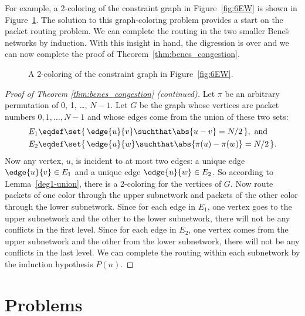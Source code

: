 For example, a 2-coloring of the constraint graph in
Figure~\ref{fig:6EW} is shown in Figure~\ref{fig:6EX}.  The solution
to this graph-coloring problem provides a start on the packet routing
problem.  We can complete the routing in the two smaller Bene\u{s}
networks by induction.  With this insight in hand, the digression is
over and we can now complete the proof of
Theorem~\ref{thm:benes_congestion}.

\begin{figure}


\caption{A 2-coloring of the constraint graph in
  Figure~\ref{fig:6EW}.}

\label{fig:6EX}

\end{figure}

\begin{proof}[Proof of Theorem \ref{thm:benes_congestion}
    \textup(continued\textup)]

Let $\pi$ be an arbitrary permutation of 0, 1, \dots, $N-1$.  Let $G$
be the graph whose vertices are packet numbers $0, 1, \dots, N-1$ and
whose edges come from the union of these two sets:
\begin{align*}
E_1 \eqdef &  \set{\, \edge{u}{v} \suchthat \abs{u - v} = N/2 \,},\ \text{and} \\
E_2 \eqdef &  \set{\, \edge{u}{w} \suchthat \abs{\pi(u) - \pi(w)} = N/2\,}.
\end{align*}
Now any vertex, $u$, is incident to at most two edges: a unique edge
$\edge{u}{v} \in E_1$ and a unique edge $\edge{u}{w} \in E_2$.  So
according to Lemma~\ref{deg1-union}, there is a 2-coloring for the
vertices of $G$.  Now route packets of one color through the upper
subnetwork and packets of the other color through the lower
subnetwork.  Since for each edge in $E_1$, one vertex goes to the
upper subnetwork and the other to the lower subnetwork, there will not
be any conflicts in the first level.  Since for each edge in $E_2$,
one vertex comes from the upper subnetwork and the other from the
lower subnetwork, there will not be any conflicts in the last level.
We can complete the routing within each subnetwork by the induction
hypothesis $P(n)$.
\end{proof}

\section{Problems}

